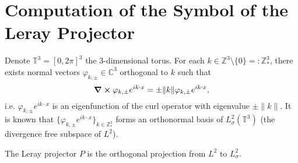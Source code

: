 \documentclass[]{article}
\theoremstyle{definition}
\theoremstyle{definition}
\let\phi\varphi
\begin{document}
\section*{Computation of the Symbol of the Leray Projector}

Denote \(\mathbb{T}^3 = [0, 2\pi]^3\) the 3-dimensional torus. For each 
\(k \in \mathbb{Z}^3 \setminus \{0\} =: \mathbb{Z}^3_*\), there exists normal vectors 
\(\phi_{k, \pm} \in \mathbb{C}^3\) orthogonal to \(k\) such that 
\[\curl{\phi_{k, \pm} e^{i k \cdot x}} = \pm \|k\| \phi_{k, \pm} e^{ik \cdot x},\]
i.e. \(\phi_{k, \pm} e^{ik \cdot x}\) is an eigenfunction of the curl operator with eigenvalue 
\(\pm \|k\|\). It is known that \(\{\phi_{k, \pm} e^{ik \cdot x}\}_{k \in \mathbb{Z}^3_*}\)
forms an orthonormal basis of \(L_\sigma^2(\mathbb{T}^3)\) (the divergence free subspace of \(L^2\)).

The Leray projector \(P\) is the orthogonal projection from \(L^2\) to \(L_\sigma^2\). 
\end{document}
